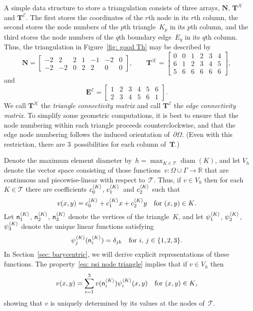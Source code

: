 A simple data structure to store a triangulation consists of three arrays,
$\boldsymbol{N}$, $\boldsymbol{T}^{\mathcal{K}}$ and
$\boldsymbol{T}^{\mathcal{E}}$.  The first stores the coordinates of the
$r$th node in its $r$th column, the second stores the node numbers of the
$p$th triangle~$K_p$ in its $p$th column, and the third stores the node numbers
of the $q$th boundary edge~$E_q$ in its $q$th column.  Thus, the triangulation
in Figure~\ref{fig: good Th} may be described by
\[
\boldsymbol{N}=\begin{bmatrix}
-2& 2& 2& 1&-1&-2& 0\\                
-2&-2& 0& 2& 2& 0& 0
\end{bmatrix},\qquad
\boldsymbol{T}^{\mathcal{K}}=\begin{bmatrix}
0&0&1&2&3&4\\
6&1&2&3&4&5\\
5&6&6&6&6&6\end{bmatrix},
\]
and
\[
\boldsymbol{E}^{\mathcal{E}}=\begin{bmatrix}
1&2&3&4&5&6\\
2&3&4&5&6&1\end{bmatrix}.
\]
We call $\boldsymbol{T}^{\mathcal{K}}$ the \emph{triangle connectivity matrix}
and call $\boldsymbol{T}^{\mathcal{E}}$ the \emph{edge connectivity matrix}.
To simplify some geometric computations, it is best to ensure that the node
numbering within each triangle proceeds counterclockwise, and that the edge
node numbering follows the induced orientation of~$\partial\Omega$. (Even with 
this restriction, there are $3$~possibilities for each column 
of~$\boldsymbol{T}$.)

Denote the maximum element diameter 
by~$h=\max_{K\in\mathcal{T}}\operatorname{diam}(K)$, and let $V_h$ denote the 
vector space consisting of those functions~$v:\Omega\cup\Gamma\to\mathbb{R}$ 
that are continuous and piecewise-linear with respect to~$\mathcal{T}$.  Thus,
if $v\in V_h$ then for each~$K\in\mathcal{T}$ there are coefficients 
$c^{\langle K\rangle}_0$, $c^{\langle K\rangle}_1$~and $c^{\langle K\rangle}_2$ such that
\begin{equation}\label{eq: v K 1 x y}
v(x,y)=c^{\langle K\rangle}_0+c^{\langle K\rangle}_1x+c^{\langle K\rangle}_2y
	\quad\text{for $(x,y)\in K$.}
\end{equation}
Let $\mathsf{n}^{\langle K\rangle}_1$, $\mathsf{n}^{\langle K\rangle}_2$, $\mathsf{n}^{\langle K\rangle}_3$ 
denote the vertices of the triangle~$K$, and let $\psi^{\langle K\rangle}_1$, 
$\psi^{\langle K\rangle}_2$, $\psi^{\langle K\rangle}_3$ denote the unique linear functions 
satisfying
\begin{equation}\label{eq: psi node triangle}
\psi^{\langle K\rangle}_j(\mathsf{n}^{\langle K\rangle}_i)=\delta_{jk}
	\quad\text{for $i$, $j\in\{1,2,3\}$.}
\end{equation}
In Section~\ref{sec: barycentric}, we will derive explicit representations of 
these functions.  The property~\eqref{eq: psi node triangle} implies that if 
$v\in V_h$ then
\[
v(x,y)=\sum_{i=1}^3v(\mathsf{n}^{\langle K\rangle}_i)\psi^{\langle K\rangle}_i(x,y)
	\quad\text{for $(x,y)\in K$,}
\]
showing that $v$ is uniquely determined by its values at the nodes 
of~$\mathcal{T}$.

